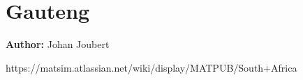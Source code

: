 \section{Gauteng}
\label{sec:gauteng}
\hfill \textbf{Author:} Johan Joubert

\citep[][]{JoubertJEtAl_TRR_2010}
https://matsim.atlassian.net/wiki/display/MATPUB/South+Africa

